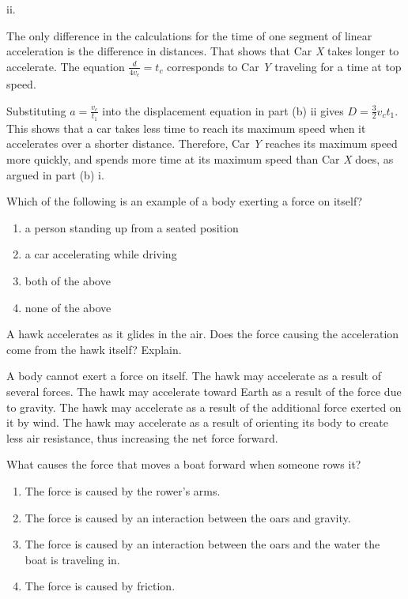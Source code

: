 \documentclass[
]{book}
\providecommand{\tightlist}{%
  \setlength{\itemsep}{0pt}\setlength{\parskip}{0pt}}
\newenvironment{ap-test-prep}{}{}
\begin{document}
\begin{ap-test-prep}
ii.

The only difference in the calculations for the time of one segment of
linear acceleration is the difference in distances. That shows that Car
\emph{X} takes longer to accelerate. The equation \(\frac{d}{4v_{c}} = t_{c}\)
corresponds to Car \emph{Y} traveling for a time at top speed.

Substituting \(a = \frac{v_{c}}{t_{1}}\) into the displacement equation in
part (b) ii gives \(D = \frac{3}{2}v_{c}t_{1}\). This shows that a car
takes less time to reach its maximum speed when it accelerates over a
shorter distance. Therefore, Car \emph{Y} reaches its maximum speed more
quickly, and spends more time at its maximum speed than Car \emph{X} does, as
argued in part (b) i.

\hypertarget{fs-id1266227}{}
\leavevmode\hypertarget{fs-id1480080}{}%
Which of the following is an example of a body exerting a force on
itself?

\begin{enumerate}
\def\labelenumi{\alph{enumi}.}
\tightlist
\item
  a person standing up from a seated position
\item
  a car accelerating while driving
\item
  both of the above
\item
  none of the above
\end{enumerate}

\hypertarget{fs-id1470278}{}
\leavevmode\hypertarget{fs-id2175837}{}%
A hawk accelerates as it glides in the air. Does the force causing the
acceleration come from the hawk itself? Explain.

\leavevmode\hypertarget{fs-id1904859}{}%
A body cannot exert a force on itself. The hawk may accelerate as a
result of several forces. The hawk may accelerate toward Earth as a
result of the force due to gravity. The hawk may accelerate as a result
of the additional force exerted on it by wind. The hawk may accelerate
as a result of orienting its body to create less air resistance, thus
increasing the net force forward.

\hypertarget{fs-id1418886}{}
\leavevmode\hypertarget{fs-id1701746}{}%
What causes the force that moves a boat forward when someone rows it?

\begin{enumerate}
\def\labelenumi{\alph{enumi}.}
\tightlist
\item
  The force is caused by the rower's arms.
\item
  The force is caused by an interaction between the oars and gravity.
\item
  The force is caused by an interaction between the oars and the water
  the boat is traveling in.
\item
  The force is caused by friction.
\end{enumerate}

\end{ap-test-prep}
\end{document}

